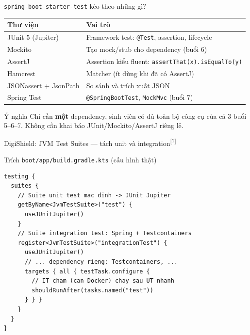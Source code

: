 \documentclass[aspectratio=169,12pt]{beamer}
\newcommand{\sref}[1]{\textsuperscript{\scriptsize[#1]}}
\begin{document}
\begin{frame}{\texttt{spring-boot-starter-test} kéo theo những gì?}
  \renewcommand{\arraystretch}{1.2}
  \begin{tabularx}{\textwidth}{lX}
    \toprule
    \textbf{Thư viện} & \textbf{Vai trò} \\
    \midrule
    JUnit 5 (Jupiter) & Framework test: \texttt{@Test}, assertion, lifecycle \\
    Mockito & Tạo mock/stub cho dependency (buổi 6) \\
    AssertJ & Assertion kiểu fluent: \texttt{assertThat(x).isEqualTo(y)} \\
    Hamcrest & Matcher (ít dùng khi đã có AssertJ) \\
    JSONassert + JsonPath & So sánh và trích xuất JSON \\
    Spring Test & \texttt{@SpringBootTest}, \texttt{MockMvc} (buổi 7) \\
    \bottomrule
  \end{tabularx}
  \renewcommand{\arraystretch}{1}

  \vspace{0.5em}
  \begin{exampleblock}{Ý nghĩa}
    Chỉ cần \textbf{một} dependency, sinh viên có đủ toàn bộ công cụ
    của cả 3 buổi 5--6--7. Không cần khai báo JUnit/Mockito/AssertJ riêng lẻ.
  \end{exampleblock}
\end{frame}

\begin{frame}[fragile,shrink=12]{DigiShield: JVM Test Suites --- tách unit và integration\sref{7}}
  \begin{block}{\small Trích \texttt{boot/app/build.gradle.kts} (cấu hình thật)}
\begin{lstlisting}[style=nonumber]
testing {
  suites {
    // Suite unit test mac dinh -> JUnit Jupiter
    getByName<JvmTestSuite>("test") {
      useJUnitJupiter()
    }
    // Suite integration test: Spring + Testcontainers
    register<JvmTestSuite>("integrationTest") {
      useJUnitJupiter()
      // ... dependency rieng: Testcontainers, ...
      targets { all { testTask.configure {
        // IT cham (can Docker) chay sau UT nhanh
        shouldRunAfter(tasks.named("test"))
      } } }
    }
  }
}
\end{lstlisting}
  \end{block}
\end{frame}
\end{document}
